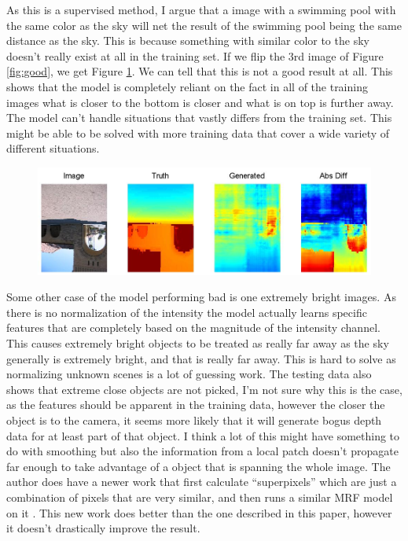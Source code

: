 \documentclass[journal]{IEEEtran}
\begin{document}
As this is a supervised method, I argue that a image with a swimming pool with the same color as the sky will net the result of the swimming pool being the same distance as the sky. This is because something with similar color to the sky doesn't really exist at all in the training set. If we flip the 3rd image of Figure \ref{fig:good}, we get Figure \ref{fig:flip}. We can tell that this is not a good result at all. This shows that the model is completely reliant on the fact in all of the training images what is closer to the bottom is closer and what is on top is further away. The model can't handle situations that vastly differs from the training set. This might be able to be solved with more training data that cover a wide variety of different situations.

\begin{figure}
\label{fig:flip}
\centering
\includegraphics[width=\linewidth]{flip.png}
\caption{}
\end{figure}

Some other case of the model performing bad is one extremely bright images. As there is no normalization of the intensity the model actually learns specific features that are completely based on the magnitude of the intensity channel. This causes extremely bright objects to be treated as really far away as the sky generally is extremely bright, and that is really far away. This is hard to solve as normalizing unknown scenes is a lot of guessing work. The testing data also shows that extreme close objects are not picked, I'm not sure why this is the case, as the features should be apparent in the training data, however the closer the object is to the camera, it seems more likely that it will generate bogus depth data for at least part of that object. I think a lot of this might have something to do with smoothing but also the information from a local patch doesn't propagate far enough to take advantage of a object that is spanning the whole image. The author does have a newer work that first calculate ``superpixels'' which are just a combination of pixels that are very similar, and then runs a similar MRF model on it \cite{saxenaSU}. This new work does better than the one described in this paper, however it doesn't drastically improve the result.
\end{document}
